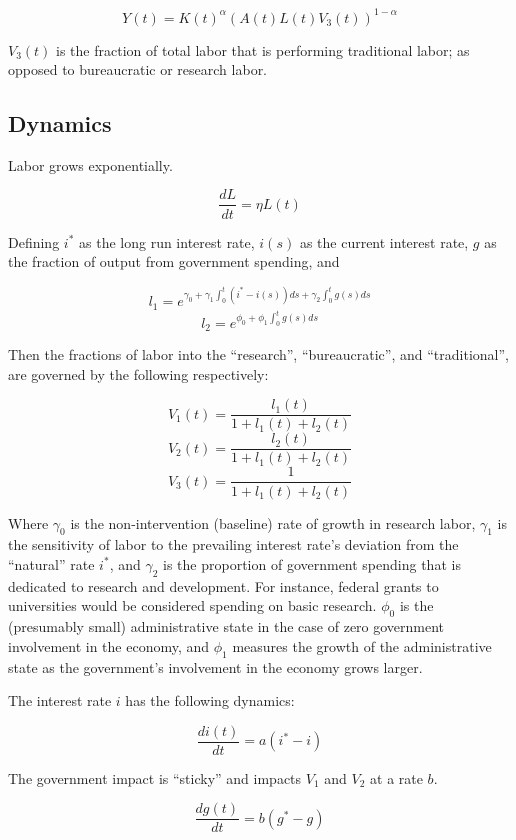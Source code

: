 \documentclass[12pt]{article}
\theoremstyle{definition}
\begin{document}
\[Y(t)=K(t)^\alpha (A(t)L(t)V_3(t))^{1-\alpha}\]

\(V_3(t)\) is the fraction of total labor that is performing traditional labor; as opposed to bureaucratic or research labor.  

\subsection{Dynamics}

Labor grows exponentially.

\[\frac{dL}{dt}=\eta L(t)\]

Defining \(i^*\) as the long run interest rate, \(i(s)\) as the current interest rate, \(g\) as the fraction of output from government spending, and 

\[l_1=e^{\gamma_0+\gamma_1 \int_0^t \left(i^*-i(s)\right) ds+\gamma_2 \int_0^t g(s) ds }\]
\[l_2=e^{\phi_0+\phi_1 \int_0^t g(s) ds}\]

Then the fractions of labor into the ``research'',  ``bureaucratic'', and ``traditional'', are governed by the following respectively:

\[V_1(t)=\frac{l_1(t)}{1+l_1(t)+l_2(t)}\]
\[V_2(t)=\frac{l_2(t)}{1+l_1(t)+l_2(t)}\]
\[V_3(t)=\frac{1}{1+l_1(t)+l_2(t)}\]

Where \(\gamma_0\) is the non-intervention (baseline) rate of growth in research labor, \(\gamma_1\) is the sensitivity of labor to the prevailing interest rate's deviation from the ``natural'' rate \(i^*\), and \(\gamma_2\) is the proportion of government spending that is dedicated to research and development.  For instance, federal grants to universities would be considered spending on basic research.  \(\phi_0\) is the (presumably small) administrative state in the case of zero government involvement in the economy, and \(\phi_1\) measures the growth of the administrative state as the government's involvement in the economy grows larger. 

The interest rate \(i\) has the following dynamics: 

\[\frac{di(t)}{dt}=a\left(i^*-i\right)\]

The government impact is ``sticky'' and impacts \(V_1\) and \(V_2\) at a rate \(b\).

\[\frac{dg(t)}{dt}=b\left(g^*-g\right)\]
\end{document}
